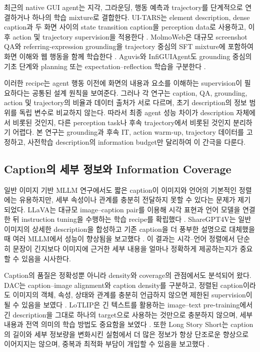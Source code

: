 최근의 native GUI agent는 지각, 그라운딩, 행동 예측과 trajectory를
단계적으로 연결하거나 하나의 학습 mixture로 결합한다. UI-TARS는
element description, dense caption과 두 화면 사이의 state transition
caption을 perception data로 사용하고, 이후 action 및 trajectory
supervision을 적용한다 \citep{qin2025uitars}. MolmoWeb은 대규모
screenshot QA와 referring-expression grounding을 trajectory 중심의
SFT mixture에 포함하여 화면 이해와 웹 행동을 함께 학습한다
\citep{gupta2026molmoweb}. Aguvis와 InfiGUIAgent도 grounding 중심의
기초 단계와 planning 또는 expectation--reflection 학습을 구분한다
\citep{xu2025aguvis,liu2026infiguiagent}.

이러한 recipe는 agent 행동 이전에 화면의 내용과 요소를 이해하는
supervision이 필요하다는 공통된 설계 원칙을 보여준다. 그러나 각 연구는
caption, QA, grounding, action 및 trajectory의 비율과 데이터 출처가
서로 다르며, 초기 description의 정보 범위를 독립 변수로 비교하지
않는다. 따라서 최종 agent 성능 차이가 description 자체에서 비롯된
것인지, 다른 perception task나 후속 trajectory에서 비롯된 것인지
분리하기 어렵다. 본 연구는 grounding과 후속 IT, action warm-up,
trajectory 데이터를 고정하고, 사전학습 description의 information
budget만 달리하여 이 간극을 다룬다.

\subsection{Caption의 세부 정보와 Information Coverage}

일반 이미지 기반 MLLM 연구에서도 짧은 caption이 이미지와 언어의
기본적인 정렬에는 유용하지만, 세부 속성이나 관계를 충분히 전달하지
못할 수 있다는 문제가 제기되었다. LLaVA는 대규모 image--caption
pair를 이용해 시각 표현과 언어 모델을 연결한 뒤 instruction tuning을
수행하는 학습 recipe를 확립했다 \citep{liu2023llava}. ShareGPT4V는
일반 이미지의 상세한 description을 합성하고 기존 caption을 더 풍부한
설명으로 대체했을 때 여러 MLLM에서 성능이 향상됨을 보고했다
\citep{chen2024sharegpt4v}. 이 결과는 시각--언어 정렬에서 단순히
문장이 긴지보다 이미지에 근거한 세부 내용을 얼마나 정확하게 제공하는지가
중요할 수 있음을 시사한다.

Caption의 품질은 정확성뿐 아니라 density와 coverage의 관점에서도
분석되어 왔다. DAC는 caption--image alignment와 caption density를
구분하고, 정렬된 caption이라도 이미지의 객체, 속성, 상태와 관계를
충분히 언급하지 않으면 제한된 supervision이 될 수 있음을 보였다
\citep{doveh2023dac}. LoTLIP은 긴 텍스트를 활용하는 image--text
pre-training에서 긴 description을 그대로 하나의 target으로 사용하는
것만으로 충분하지 않으며, 세부 내용과 전역 의미의 학습 방법도 중요함을
보였다 \citep{wu2024lotlip}. 또한 Long Story Short는 caption의 길이와
세부 정보량을 변화시킨 실험에서 더 많은 정보가 항상 단조로운 향상으로
이어지지는 않으며, 중복과 최적화 부담이 개입할 수 있음을 보고했다
\citep{salazar2026longstory}.

